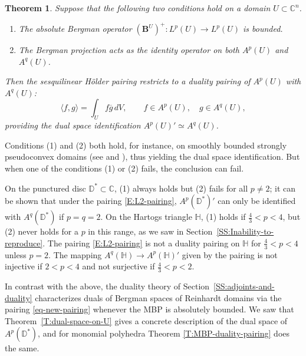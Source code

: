 \documentclass[letterpaper,11pt,reqno]{amsart}
\theoremstyle{plain}
\newtheorem{theorem}[equation]{Theorem}
\theoremstyle{definition}
\theoremstyle{remark}
\theoremstyle{remark}
\numberwithin{equation}{section}
\newcommand{\ol}{\overline}
\newcommand{\cx}{{\mathbb C}}
\newcommand{\C}{{\mathbb C}}
\newcommand{\D}{{\mathbb D}}
\newcommand{\h}{{\mathbb H}}
\begin{document}
\begin{theorem}\label{E:L2-duality-classic}
Suppose that the following two conditions hold on a domain $U\subset \cx^n$.
\begin{enumerate}
\item The absolute Bergman operator $(\bm{B}^U)^+: L^p(U) \to L^p(U)$ is bounded.
\item The Bergman projection acts as the identity operator on both $A^p(U)$ and $A^q(U)$.
\end{enumerate}
Then the sesquilinear Hölder pairing restricts to a duality pairing of $A^p(U)$ with $A^q(U)$:
\begin{equation}\label{E:L2-pairing}
\langle f,g \rangle = \int_U f \ol{g}\,dV, \qquad f\in A^p(U), \quad g\in A^q(U),
\end{equation}
providing the dual space identification $A^p(U)' \simeq A^q(U)$.
\end{theorem}

Conditions (1) and (2) both hold, for instance, on smoothly bounded strongly pseudoconvex domains (see \cite{PhoSte77} and \cite{catlin}), thus yielding the dual space identification. 
But when one of the conditions (1) or (2) fails, the conclusion can fail. 

On the punctured disc $\D^* \subset \C$, (1) always holds but (2) fails for all $p\not=2$; it can be shown that under the pairing \eqref{E:L2-pairing}, $A^p(\D^*)'$ can only be identified with $A^q(\D^*)$ if $p=q=2$.
On the Hartogs triangle $\h$, (1) holds if $\frac{4}{3}<p<4$, but (2) never holds for a $p$ in this range, as we saw in Section~\ref{SS:Inability-to-reproduce}. The pairing \eqref{E:L2-pairing} is not a duality pairing on $\h$ for $\frac{4}{3}<p<4$ unless $p=2$.
The mapping $A^q(\h)\to A^p(\h)'$
given by the pairing is not injective if $2<p<4$ and not surjective if 
$\frac{4}{3}<p<2$.

In contrast with the above, the duality theory of Section~\ref{SS:adjoints-and-duality} characterizes duals of Bergman spaces of Reinhardt domains via the pairing \eqref{eq-new-pairing} whenever the MBP is absolutely bounded.
We saw that Theorem~\ref{T:dual-space-on-U} gives a concrete description of the dual space of $A^p(\D^*)$, and for monomial polyhedra Theorem \ref{T:MBP-duality-pairing} does the same. 



\end{document}
